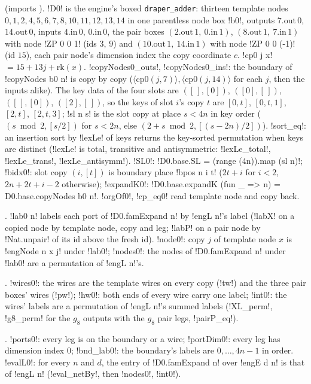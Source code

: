 { (imports ). \lbx!D0! is the engine's boxed \texttt{draper\_adder}: thirteen template nodes $0,1,2,4,5,6,7,8,10,11,12,13,14$ in one parentless node box \lbx!b0!, outputs $7.\mathrm{out}\,0$, $14.\mathrm{out}\,0$, inputs $4.\mathrm{in}\,0$, $0.\mathrm{in}\,0$, the pair boxes $(2.\mathrm{out}\,1,\ 0.\mathrm{in}\,1)$, $(8.\mathrm{out}\,1,\ 7.\mathrm{in}\,1)$ with node \lbx!ZP 0 0 1! (ids $3$, $9$) and $(10.\mathrm{out}\,1,\ 14.\mathrm{in}\,1)$ with node \lbx!ZP 0 0 (-1)! (id $15$), each pair node's dimension index the copy coordinate $c$. \lbx!cp0 j x! $=15+13j+\mathrm{rk}(x)$. \lbx!copyNodes0_outs!, \lbx!copyNodes0_ins!: the boundary of \lbx!copyNodes b0 n! is copy by copy ($\langle\mathrm{cp0}(j,7)\rangle,\langle\mathrm{cp0}(j,14)\rangle$ for each $j$, then the inputs alike). The key data of the four slots are $([\,],[0])$, $([0],[\,])$, $([\,],[0])$, $([2],[\,])$, so the keys of slot $i$'s copy $t$ are $[0,t]$, $[0,t,1]$, $[2,t]$, $[2,t,3]$; \lbx!sl n s! is the slot copy at place $s<4n$ in key order ($(s \bmod 2, [s/2])$ for $s<2n$, else $(2+s \bmod 2,[(s-2n)/2])$). \lbx!sort_eq!: an insertion sort by \lbx!lexLe! of keys returns the key-sorted permutation when keys are distinct (\lbx!lexLe! is total, transitive and antisymmetric: \lbx!lexLe_total!, \lbx!lexLe_trans!, \lbx!lexLe_antisymm!). \lbx!SL0!: \lbx!D0.base.SL = (range (4n)).map (sl n)!; \lbx!bidx0!: slot copy $(i,[t])$ is boundary place \lbx!bpos n i t! ($2t+i$ for $i<2$, $2n+2t+i-2$ otherwise); \lbx!expandK0!: \lbx!D0.base.expandK (fun _ => n) = D0.base.copyNodes b0 n!. \lbx!orgOf0!, \lbx!cp_eq0! read template node and copy back.

. \lbx!lab0 n! labels each port of \lbx!D0.famExpand n! by \lbx!engL n!'s label (\lbx!labX! on a copied node by template node, copy and leg; \lbx!labP! on a pair node by \lbx!Nat.unpair! of its id above the fresh id). \lbx!node0!: copy $j$ of template node $x$ is \lbx!engNode n x j! under \lbx!lab0!; \lbx!nodes0!: the nodes of \lbx!D0.famExpand n! under \lbx!lab0! are a permutation of \lbx!engL n!'s.

. \lbx!wires0!: the wires are the template wires on every copy (\lbx!tw!) and the three pair boxes' wires (\lbx!pw!); \lbx!hw0!: both ends of every wire carry one label; \lbx!int0!: the wires' labels are a permutation of \lbx!engL n!'s summed labels (\lbx!XL_perm!, \lbx!g8_perm! for the $g_8$ outputs with the $g_8$ pair legs, \lbx!pairP_eq!).

. \lbx!ports0!: every leg is on the boundary or a wire; \lbx!portDim0!: every leg has dimension index $0$; \lbx!bnd_lab0!: the boundary's labels are $0,\ldots,4n-1$ in order. \lbx!evalL0!: for every $n$ and $d$, the entry of \lbx!D0.famExpand n! over \lbx!engE d n! is that of \lbx!engL n! (\lbx!eval_netBy!, then \lbx!nodes0!, \lbx!int0!).

}
